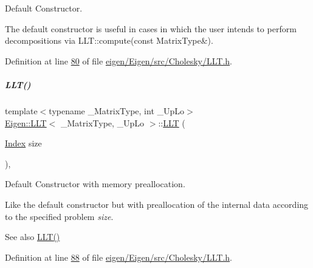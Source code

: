 Default Constructor. 

The default constructor is useful in cases in which the user intends to perform decompositions via L\+L\+T\+::compute(const Matrix\+Type\&). 

Definition at line \hyperlink{eigen_2_eigen_2src_2_cholesky_2_l_l_t_8h_source_l00080}{80} of file \hyperlink{eigen_2_eigen_2src_2_cholesky_2_l_l_t_8h_source}{eigen/\+Eigen/src/\+Cholesky/\+L\+L\+T.\+h}.

\mbox{\label{group___cholesky___module_ab3656cfbdf38e03c57d5cf79bf8131b6}} 
\subparagraph{\texorpdfstring{L\+L\+T()}{LLT()}\hspace{0.1cm}{\footnotesize\ttfamily [2/6]}}
{\footnotesize\ttfamily template$<$typename \+\_\+\+Matrix\+Type, int \+\_\+\+Up\+Lo$>$ \\
\hyperlink{group___cholesky___module_class_eigen_1_1_l_l_t}{Eigen\+::\+L\+LT}$<$ \+\_\+\+Matrix\+Type, \+\_\+\+Up\+Lo $>$\+::\hyperlink{group___cholesky___module_class_eigen_1_1_l_l_t}{L\+LT} (\begin{DoxyParamCaption}\item[{\hyperlink{group___cholesky___module_ac7a64274814fa76e8b1e9e945546037f}{Index}}]{size }\end{DoxyParamCaption})\hspace{0.3cm}{\ttfamily [inline]}, {\ttfamily [explicit]}}



Default Constructor with memory preallocation. 

Like the default constructor but with preallocation of the internal data according to the specified problem {\itshape size}. \begin{DoxySeeAlso}{See also}
\hyperlink{group___cholesky___module_a16d1ec9ea6497ba1febb242c2e8a7a96}{L\+L\+T()} 
\end{DoxySeeAlso}


Definition at line \hyperlink{eigen_2_eigen_2src_2_cholesky_2_l_l_t_8h_source_l00088}{88} of file \hyperlink{eigen_2_eigen_2src_2_cholesky_2_l_l_t_8h_source}{eigen/\+Eigen/src/\+Cholesky/\+L\+L\+T.\+h}.


